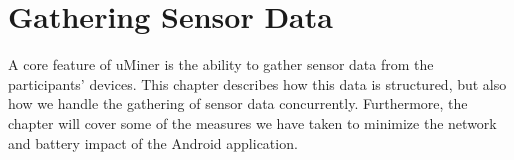 \chapter{Gathering Sensor Data}
\label{cha:gathering_sensor_data}

A core feature of uMiner is the ability to gather sensor data from the participants' devices. This chapter describes how this data is structured, but also how we handle the gathering of sensor data concurrently. Furthermore, the chapter will cover some of the measures we have taken to minimize the network and battery impact of the Android application.







